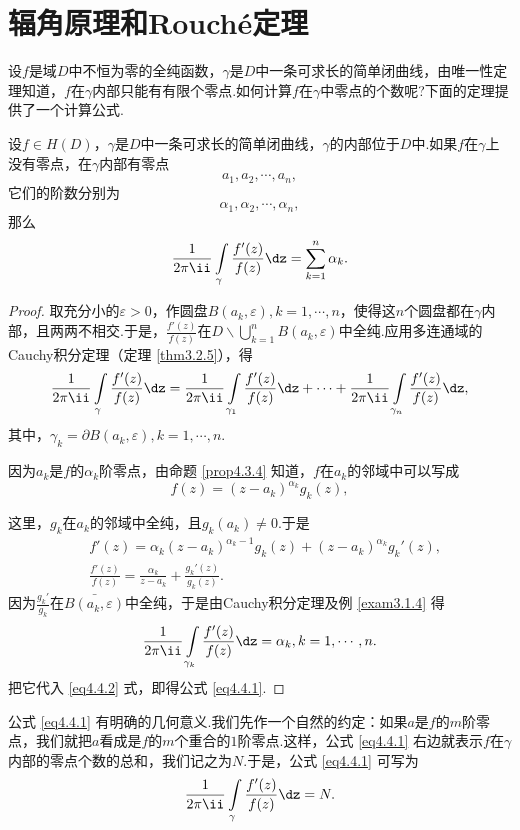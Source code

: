 \section{辐角原理和Rouch\'e定理\label{sec4.4}}
设$f$是域$D$中不恒为零的全纯函数，$\gamma$是$D$中一条可求长的简单闭曲线，由唯一性定理知道，$f$在$\gamma$内部只能有有限个零点.如何计算$f$在$\gamma$中零点的个数呢?下面的定理提供了一个计算公式.

\begin{theorem}\label{thm4.4.1}
设$f\in H(D)$，$\gamma$是$D$中一条可求长的简单闭曲线，$\gamma$的内部位于$D$中.如果$f$在$\gamma$上没有零点，在$\gamma$内部有零点
\[a_1,a_2,\cdots,a_n,\]
它们的阶数分别为
\[\alpha_1,\alpha_2,\cdots,\alpha_n,\]
那么
\begin{equation}\label{eq4.4.1}
\frac1{2\pi\ii}\int\limits_{\gamma}\frac{f'(z)}{f(z)}\dz=\sum_{k=1}^n\alpha_k.
\end{equation}
\end{theorem}
\begin{proof}
取充分小的$\varepsilon>0$，作圆盘$B(a_k,\varepsilon),k=1,\cdots,n$，使得这$n$个圆盘都在$\gamma$内部，且两两不相交.于是，$\frac{f'(z)}{f(z)}$在$D\backslash
\bigcup_{k=1}^nB(a_k,\varepsilon)$中全纯.应用多连通域的Cauchy积分定理（定理 \ref{thm3.2.5}），得
\begin{equation}\label{eq4.4.2}
\frac1{2\pi\ii}\int\limits_{\gamma}\frac{f'(z)}{f(z)}\dz
=\frac1{2\pi\ii}\int\limits_{\gamma_1}\frac{f'(z)}{f(z)}\dz+\cdots+
\frac1{2\pi\ii}\int\limits_{\gamma_n}\frac{f'(z)}{f(z)}\dz,
\end{equation}
其中，$\gamma_k=\partial B(a_k,\varepsilon),k=1,\cdots,n$.

因为$a_k$是$f$的$\alpha_k$阶零点，由命题 \ref{prop4.3.4} 知道，$f$在$a_k$的邻域中可以写成
\[f(z)=(z-a_k)^{\alpha_k}g_k(z),\]

这里，$g_k$在$a_k$的邻域中全纯，且$g_k(a_k)\ne0$.于是
\begin{align*}
&f'(z)=\alpha_k(z-a_k)^{\alpha_k-1}g_k(z)+(z-a_k)^{\alpha_k}g_k'(z),\\
&\frac{f'(z)}{f(z)}=\frac{\alpha_k}{z-a_k}+\frac{g_k'(z)}{g_k(z)}.
\end{align*}
因为$\frac{g_k'}{g_k}$在$\bar{B(a_k,\varepsilon)}$中全纯，于是由Cauchy积分定理及例 \ref{exam3.1.4} 得
\[\frac1{2\pi\ii}\int\limits_{\gamma_k}\frac{f'(z)}{f(z)}\dz=\alpha_k,k=1,\cdots,n.\]
把它代入 \eqref{eq4.4.2} 式，即得公式 \eqref{eq4.4.1}.
\end{proof}

公式 \eqref{eq4.4.1} 有明确的几何意义.我们先作一个自然的约定：如果$a$是$f$的$m$阶零点，我们就把$a$看成是$f$的$m$个重合的$1$阶零点.这样，公式 \eqref{eq4.4.1} 右边就表示$f$在$\gamma$内部的零点个数的总和，我们记之为$N$.于是，公式 \eqref{eq4.4.1} 可写为
\begin{equation}\label{eq4.4.3}
\frac1{2\pi\ii}\int\limits_{\gamma}\frac{f'(z)}{f(z)}\dz=N.
\end{equation}


